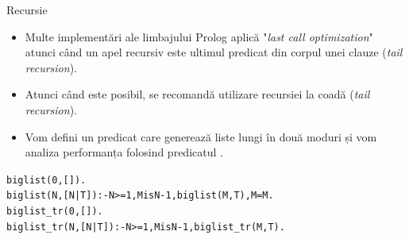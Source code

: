 \documentclass[xcolor=x11names,compress,10pt]{beamer}
\begin{document}
\begin{frame}{Recursie}

\begin{itemize}
\item Multe implementări ale limbajului Prolog aplică "{\em last call optimization}" atunci când un apel recursiv este ultimul predicat din corpul unei clauze ({\em tail recursion}).

\medskip
\item Atunci când este posibil, se recomandă utilizare recursiei la coadă ({\em tail recursion}).

\medskip
\item Vom defini un predicat care generează liste lungi în două moduri și vom analiza performanța folosind predicatul .
\end{itemize}

\pause
\begin{alltt}
biglist(0,[]).\\
biglist(N,[N|T]) :- N >= 1, M is N-1,biglist(M,T),M=M.\\

biglist\_tr(0,[]).\\
biglist\_tr(N,[N|T]) :- N >= 1, M is N-1,biglist\_tr(M,T).
\end{alltt}


\end{frame}
\end{document}
